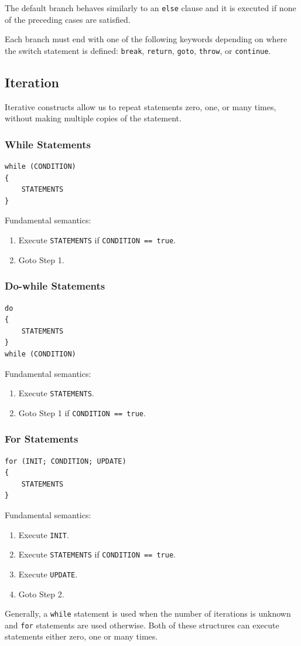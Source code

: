 \documentclass{article}
\begin{document}
The default branch behaves similarly to an \lstinline{else} clause and it is executed if
none of the preceding cases are satisfied.

Each branch must end with one of the following keywords depending on where the
switch statement is defined: \lstinline{break}, \lstinline{return},
\lstinline{goto}, \lstinline{throw}, or \lstinline{continue}.
\subsection{Iteration}
Iterative constructs allow us to repeat statements zero, one, or many times,
without making multiple copies of the statement.
\subsubsection{While Statements}
\begin{lstlisting}[numbers=none]
while (CONDITION) 
{
    STATEMENTS
}
\end{lstlisting}
Fundamental semantics:
\begin{enumerate}
    \item Execute \lstinline{STATEMENTS} if \lstinline{CONDITION == true}. %
    \item Goto Step 1.
\end{enumerate}
\subsubsection{Do-while Statements}
\begin{lstlisting}[numbers=none]
do 
{
    STATEMENTS
}
while (CONDITION) 
\end{lstlisting}
Fundamental semantics:
\begin{enumerate}
    \item Execute \lstinline{STATEMENTS}. %
    \item Goto Step 1 if \lstinline{CONDITION == true}.
\end{enumerate}
\subsubsection{For Statements}
\begin{lstlisting}[numbers=none]
for (INIT; CONDITION; UPDATE) 
{
    STATEMENTS
}
\end{lstlisting}
Fundamental semantics:
\begin{enumerate}
    \item Execute \lstinline{INIT}. %
    \item Execute \lstinline{STATEMENTS} if \lstinline{CONDITION == true}. %
    \item Execute \lstinline{UPDATE}.
    \item Goto Step 2.
\end{enumerate}
Generally, a \lstinline{while} statement is used when the number of iterations is unknown and
\lstinline{for} statements are used otherwise. Both of these structures can execute
statements either zero, one or many times.
\end{document}

